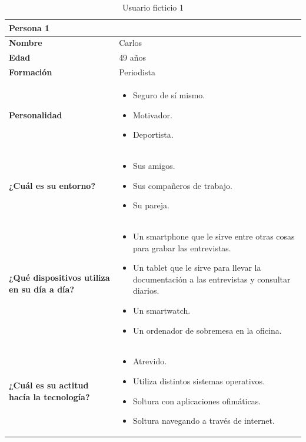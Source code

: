 \begin{table}[H]
	\begin{center}
		\begin{tabular}{| p{} |
                   p{} |}
			\hline
			Persona 1 &  \\ \hline
			\textbf{Nombre} & Carlos \\
			\textbf{Edad} & 49 años \\
			\textbf{Formación} & Periodista \\
			\textbf{Personalidad} & \begin{itemize}
                \item Seguro de sí mismo.
                \item Motivador.
                \item Deportista.
            \end{itemize} \\
			\textbf{¿Cuál es su entorno?} & \begin{itemize}
                \item Sus amigos.
                \item Sus compañeros de trabajo.
                \item Su pareja.
            \end{itemize} \\
			\textbf{¿Qué dispositivos utiliza en su día a día?} & \begin{itemize}
                \item Un smartphone que le sirve entre otras cosas para grabar las entrevistas.
                \item Un tablet que le sirve para llevar la documentación a las entrevistas y consultar diarios.
                \item Un smartwatch.
                \item Un ordenador de sobremesa en la oficina.
            \end{itemize} \\
            \textbf{¿Cuál es su actitud hacía la tecnología?} & \begin{itemize}
                \item Atrevido.
                \item Utiliza distintos sistemas operativos.
                \item Soltura con aplicaciones ofimáticas.
                \item Soltura navegando a través de internet.
            \end{itemize} \\
            \hline
		\end{tabular}
		\caption{Usuario ficticio 1}
	\end{center}
\end{table}

